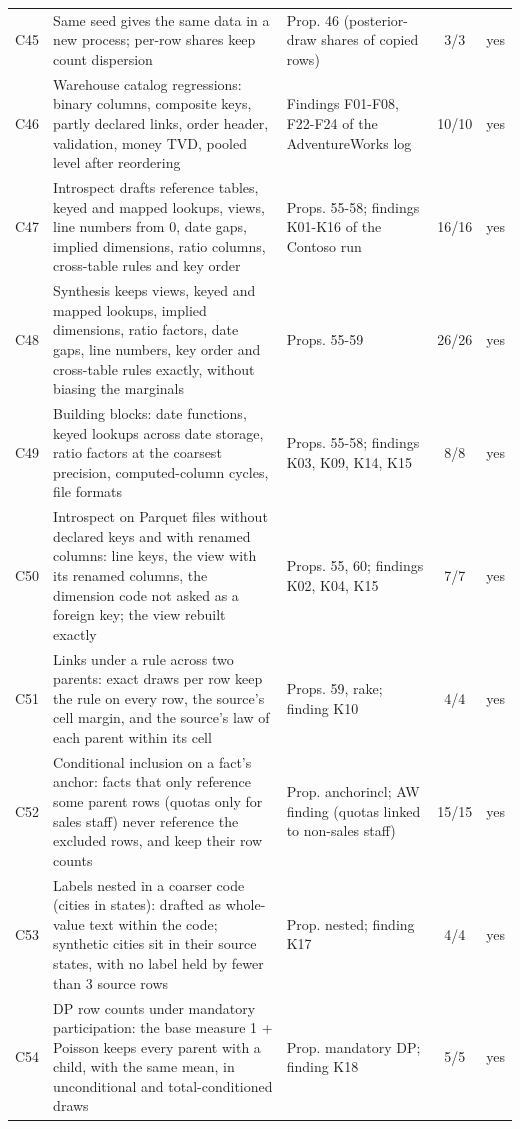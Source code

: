 \begin{longtable}{@{}l p{8.2cm} p{3.6cm} c r@{}}
C45 & Same seed gives the same data in a new process; per-row shares keep count dispersion & Prop. 46 (posterior-draw shares of copied rows) & 3/3 & yes \\
C46 & Warehouse catalog regressions: binary columns, composite keys, partly declared links, order header, validation, money TVD, pooled level after reordering & Findings F01-F08, F22-F24 of the AdventureWorks log & 10/10 & yes \\
C47 & Introspect drafts reference tables, keyed and mapped lookups, views, line numbers from 0, date gaps, implied dimensions, ratio columns, cross-table rules and key order & Props. 55-58; findings K01-K16 of the Contoso run & 16/16 & yes \\
C48 & Synthesis keeps views, keyed and mapped lookups, implied dimensions, ratio factors, date gaps, line numbers, key order and cross-table rules exactly, without biasing the marginals & Props. 55-59 & 26/26 & yes \\
C49 & Building blocks: date functions, keyed lookups across date storage, ratio factors at the coarsest precision, computed-column cycles, file formats & Props. 55-58; findings K03, K09, K14, K15 & 8/8 & yes \\
C50 & Introspect on Parquet files without declared keys and with renamed columns: line keys, the view with its renamed columns, the dimension code not asked as a foreign key; the view rebuilt exactly & Props. 55, 60; findings K02, K04, K15 & 7/7 & yes \\
C51 & Links under a rule across two parents: exact draws per row keep the rule on every row, the source's cell margin, and the source's law of each parent within its cell & Props. 59, rake; finding K10 & 4/4 & yes \\
C52 & Conditional inclusion on a fact's anchor: facts that only reference some parent rows (quotas only for sales staff) never reference the excluded rows, and keep their row counts & Prop. anchorincl; AW finding (quotas linked to non-sales staff) & 15/15 & yes \\
C53 & Labels nested in a coarser code (cities in states): drafted as whole-value text within the code; synthetic cities sit in their source states, with no label held by fewer than 3 source rows & Prop. nested; finding K17 & 4/4 & yes \\
C54 & DP row counts under mandatory participation: the base measure 1 + Poisson keeps every parent with a child, with the same mean, in unconditional and total-conditioned draws & Prop. mandatory DP; finding K18 & 5/5 & yes \\

\end{longtable}
